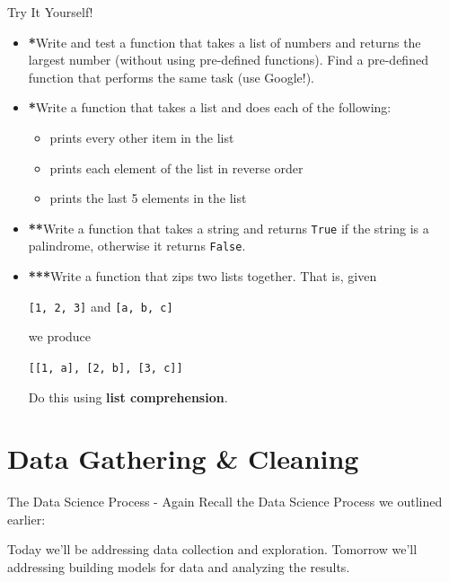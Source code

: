 \documentclass[12pt,t]{beamer}
\begin{document}
\begin{frame}{Try It Yourself!}
\scriptsize
\begin{itemize}
\item \textbf{*}Write and test a function that takes a list of numbers and returns the largest number (without using pre-defined functions). Find a pre-defined function that performs the same task (use Google!). 
\vskip0.2cm
\item \textbf{*}Write a function that takes a list and does each of the following:
\begin{itemize}
\scriptsize
\item prints every other item in the list
\item prints each element of the list in reverse order
\item prints the last 5 elements in the list
\end{itemize}
\vskip0.2cm
\item \textbf{**}Write a function that takes a string and returns \texttt{True} if the string is a palindrome, otherwise it returns \texttt{False}.
\vskip0.2cm
\item \textbf{***}Write a function that zips two lists together. That is, given
\begin{center}
\texttt{[1, 2, 3]} and \texttt{[a, b, c]}
\end{center}
we produce
\begin{center}
\texttt{[[1, a], [2, b], [3, c]]}
\end{center}
Do this using \textbf{list comprehension}.
\end{itemize}
\end{frame}

\section{Data Gathering \& Cleaning}

\begin{frame}{The Data Science Process - Again}
Recall the Data Science Process we outlined earlier:
\vskip0.2cm
\vskip0.2cm
Today we'll be addressing data collection and exploration. Tomorrow we'll addressing building models for data and analyzing the results.
\end{frame}
\end{document}
